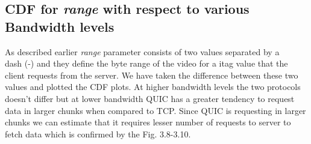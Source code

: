 \subsection{CDF for \textit{range} with respect to various Bandwidth levels}
As described earlier \textit{range} parameter consists of two values separated by a \\dash (-) and they define the byte range of the video for a itag value that the client requests from the server. We have taken the difference between these two values and plotted the CDF plots. At higher bandwidth levels the two protocols doesn't differ but at lower bandwidth QUIC has a greater tendency to request data in larger chunks when compared to TCP. Since QUIC is requesting in larger chunks we can estimate that it requires lesser number of requests to server to fetch data which is confirmed by the Fig. 3.8-3.10.

